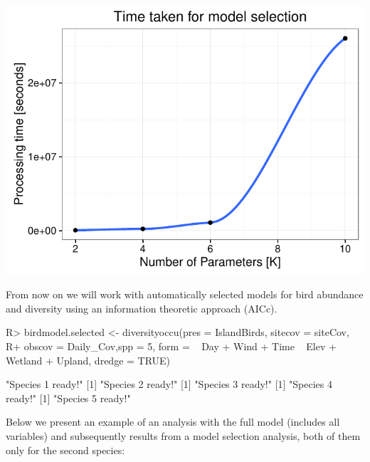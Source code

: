\documentclass[article]{jss}
\begin{document}
\begin{CodeChunk}


\begin{center}\includegraphics{diversityocc_files/figure-latex/unnamed-chunk-14-1} \end{center}

\end{CodeChunk}

From now on we will work with automatically selected models for bird
abundance and diversity using an information theoretic approach (AICc).

\begin{CodeChunk}

\begin{CodeInput}
R> birdmodel.selected <- diversityoccu(pres = IslandBirds, sitecov = siteCov,
R+ obscov = Daily_Cov,spp =  5, form = ~ Day + Wind + Time ~ Elev + Wetland + Upland, dredge = TRUE)
\end{CodeInput}

\begin{CodeOutput}
[1] "Species 1 ready!"
[1] "Species 2 ready!"
[1] "Species 3 ready!"
[1] "Species 4 ready!"
[1] "Species 5 ready!"
\end{CodeOutput}
\end{CodeChunk}

Below we present an example of an analysis with the full model (includes
all variables) and subsequently results from a model selection analysis,
both of them only for the second species:
\end{document}
